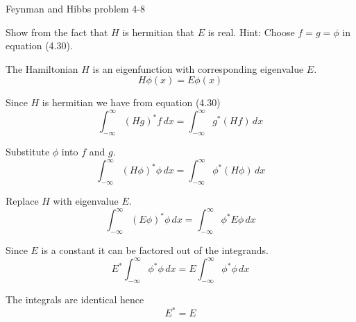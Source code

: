 \documentclass[12pt]{article}
\begin{document}
\begin{center}
Feynman and Hibbs problem 4-8
\end{center}

Show from the fact that $H$ is hermitian that $E$ is real.
Hint: Choose $f=g=\phi$ in equation (4.30).

\bigskip
The Hamiltonian $H$ is an eigenfunction with corresponding eigenvalue $E$.
\begin{equation*}
H\phi(x)=E\phi(x)
\tag{4.42}
\end{equation*}

Since $H$ is hermitian we have from equation (4.30)
\begin{equation*}
\int_{-\infty}^\infty(Hg)^*f\,dx=\int_{-\infty}^\infty g^*(Hf)\,dx
\tag{4.30}
\end{equation*}

Substitute $\phi$ into $f$ and $g$.
\begin{equation*}
\int_{-\infty}^\infty(H\phi)^*\phi\,dx=\int_{-\infty}^\infty \phi^*(H\phi)\,dx
\end{equation*}

Replace $H$ with eigenvalue $E$.
\begin{equation*}
\int_{-\infty}^\infty (E\phi)^*\phi\,dx=\int_{-\infty}^\infty \phi^*E\phi\,dx
\end{equation*}

Since $E$ is a constant it can be factored out of the integrands.
\begin{equation*}
E^*\int_{-\infty}^\infty\phi^*\phi\,dx=E\int_{-\infty}^\infty \phi^*\phi\,dx
\end{equation*}

The integrals are identical hence
\begin{equation*}
E^*=E
\end{equation*}
\end{document}
